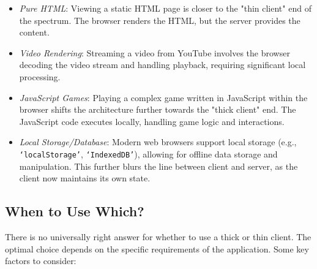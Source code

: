\begin{itemize}[itemsep=1pt]
        \item \textit{Pure HTML}:  Viewing a static HTML page is closer to the "thin client" end of the spectrum. The browser renders the HTML, but the server provides the content.
        \item \textit{Video Rendering}:  Streaming a video from YouTube involves the browser decoding the video stream and handling playback, requiring significant local processing.
        \item \textit{JavaScript Games}:  Playing a complex game written in JavaScript within the browser shifts the architecture further towards the "thick client" end. The JavaScript code executes locally, handling game logic and interactions.
        \item \textit{Local Storage/Database}:  Modern web browsers support local storage (e.g., \texttt{`localStorage'}, \texttt{`IndexedDB'}), allowing for offline data storage and manipulation.  This further blurs the line between client and server, as the client now maintains its own state.
\end{itemize}

\subsection{When to Use Which?}

There is no universally right answer for whether to use a thick or thin client. The optimal choice depends on the specific requirements of the application. Some key factors to consider:

